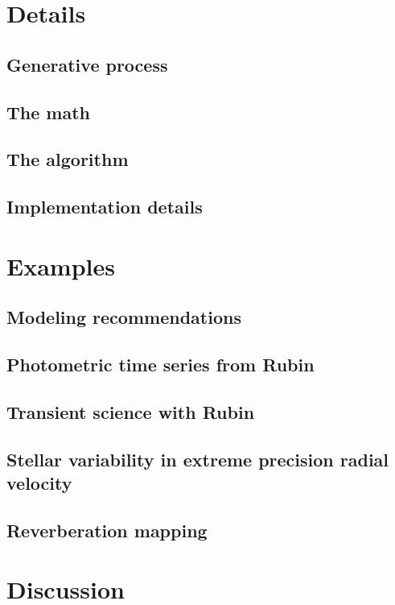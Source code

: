 \documentclass[10pt]{article}
\begin{document}
\section{Details}

\subsection{Generative process}

\subsection{The math}

\subsection{The algorithm}

\subsection{Implementation details}

\section{Examples}

\subsection{Modeling recommendations}

\subsection{Photometric time series from Rubin}

\subsection{Transient science with Rubin}

\subsection{Stellar variability in extreme precision radial velocity}

\subsection{Reverberation mapping}

\section{Discussion}
\end{document}
